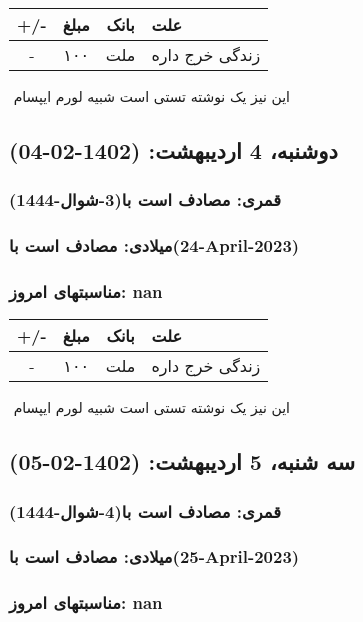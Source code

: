 \documentclass{article}
\newcommand{\rnote}[1]{\marginpar{\textcolor{color}{\StrSubstitute{\##1}{ }{\_}}}}
\newcommand{\myRow}[4]{
    #1 & #2 & #3 & #4 \\ \hline
}
\begin{document}
\begin{tabular}{ | c | c | c | p{5cm} |}
    \hline
    \myRow{ +/- }{مبلغ}{بانک}{علت}
    \myRow{-}{۱۰۰}{ملت}{زندگی خرج داره}
\end{tabular}
\newline
\newline

‌
\rnote{تست}
این نیز یک نوشته تستی است شبیه لورم ایپسام




\newpage
{}
\textcolor{color}{
\section{ دوشنبه، 4 اردیبهشت: (1402-02-04) }
\subsubsection*{قمری: مصادف است با(3-شوال-1444)} 
\subsubsection*{میلادی: مصادف است با(24-April-2023)}
\subsubsection*{مناسبتهای امروز: nan}
}


\begin{tabular}{ | c | c | c | p{5cm} |}
    \hline
    \myRow{ +/- }{مبلغ}{بانک}{علت}
    \myRow{-}{۱۰۰}{ملت}{زندگی خرج داره}
\end{tabular}
\newline
\newline

‌
\rnote{تست}
این نیز یک نوشته تستی است شبیه لورم ایپسام




\newpage
{}
\textcolor{color}{
\section{ سه شنبه، 5 اردیبهشت: (1402-02-05) }
\subsubsection*{قمری: مصادف است با(4-شوال-1444)} 
\subsubsection*{میلادی: مصادف است با(25-April-2023)}
\subsubsection*{مناسبتهای امروز: nan}
}
\end{document}

